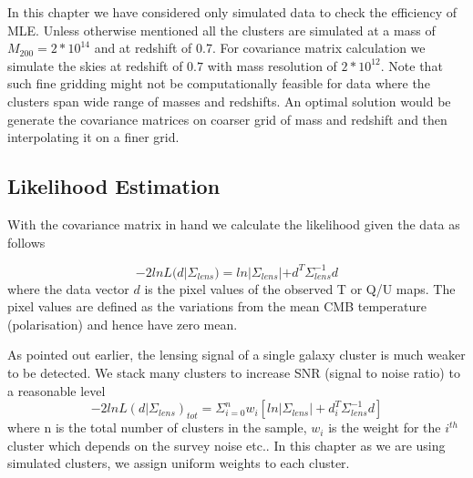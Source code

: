  In this chapter we have considered only simulated data to check the efficiency of MLE. 
 Unless otherwise mentioned all the clusters are simulated at a mass of $M_{200} = 2*10^{14}$\msolar {} and at redshift of 0.7.
 For covariance matrix calculation we simulate the skies at redshift of $0.7$ with mass resolution of $2*10^{12}$\msolar. 
 Note that such fine gridding might not be computationally feasible for data where the clusters span wide range of masses and redshifts.
 An optimal solution would be generate the covariance matrices on coarser grid of mass and redshift and then interpolating it on a finer grid.
 
 
 
  
   
  
  \subsection{Likelihood Estimation}
  With the covariance matrix in hand we calculate the likelihood given the data as follows 
  
  \begin{equation}
  -2lnL(d|\Sigma_{lens}) = ln |\Sigma_{lens}| + d^{T} \Sigma^{-1}_{lens} d
  \end{equation}
  where the data vector $d$ is the pixel values of the observed T or Q/U maps.
  The pixel values are defined as the variations from the mean CMB temperature (polarisation) and hence have zero mean.
  
  As pointed out earlier, the lensing signal of a single galaxy cluster is much weaker to be detected. 
  We stack many clusters to increase SNR (signal to noise ratio) to a reasonable level
  \begin{equation}
  -2ln L(d| \Sigma_{lens})_{tot} = \Sigma^{n}_{i =0} w_{i} [ln |\Sigma_{lens}| + d^{T}_{i} \Sigma^{-1}_{lens}  d]
  \end{equation}
  where n is the total number of clusters in the sample, $w_{i}$ is the weight for the $i^{th}$ cluster which depends on the survey noise etc.. 
  In this chapter as we are using simulated clusters, we assign uniform weights to each cluster.  

